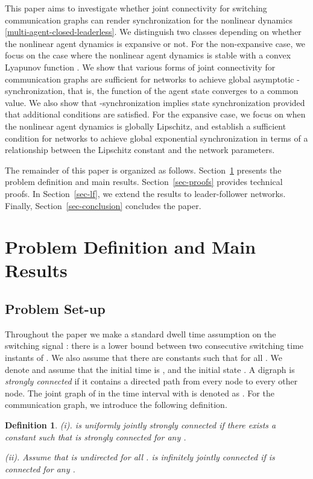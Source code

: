\documentclass[a4paper, 11pt]{article}
\newtheorem{definition}{Definition}
\begin{document}
This paper aims to investigate whether joint connectivity for switching communication graphs
can render synchronization for the nonlinear dynamics \eqref{multi-agent-closed-leaderless}.
We distinguish two classes depending on whether the nonlinear agent dynamics  is expansive or not.
For the non-expansive case, we focus on the case where the nonlinear agent dynamics is stable with a convex Lyapunov function . We show that various forms of joint connectivity for communication graphs are
sufficient for networks to achieve global asymptotic -synchronization, that is, the function  of the agent state converges to a common value.
We also show that -synchronization implies state synchronization provided that additional conditions are satisfied.
For the expansive case, we focus on when the nonlinear agent dynamics is globally Lipschitz, and
establish a sufficient condition for networks to achieve global exponential synchronization in terms of a relationship between the Lipschitz constant and the network parameters.

The remainder of this paper is organized as follows. Section~\ref{sec-prob} presents the problem definition and main results. Section~\ref{sec-proofs} provides technical proofs. In Section~\ref{sec-lf}, we extend the results to leader-follower networks. Finally, Section~\ref{sec-conclusion} concludes the paper. 

\section{Problem Definition and Main Results}\label{sec-prob}
\subsection{Problem Set-up}
Throughout the paper we make a standard dwell time assumption \cite{liberzon-morse} on  the switching signal : there is a lower bound  between two consecutive switching time instants of . We also assume that
there are constants  such that
 for all .
We denote  and
assume that the initial time is , and the initial state .
A digraph is {\it strongly connected} if it contains a directed path from every node to every other node.
The joint graph of  in the time interval  with  is denoted as .
For the communication graph, we introduce the following definition.

\begin{definition}\label{def-connected-leaderless}
(i).  is {\it uniformly jointly strongly connected} if there exists a constant  such that  is strongly connected for any .

(ii). Assume that  is undirected for all .
 is {\it infinitely jointly connected} if  is connected for any .
\end{definition}
\end{document}
